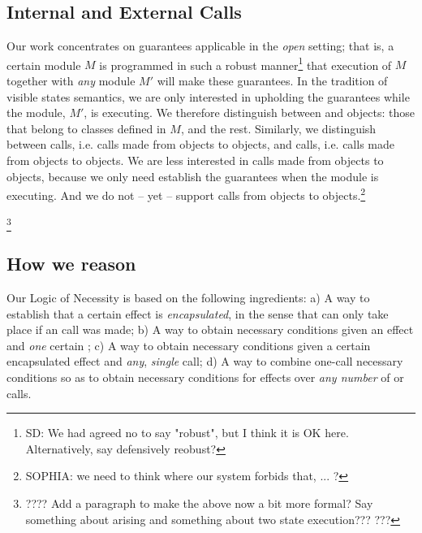 \subsection{Internal and External Calls} 
Our work concentrates on guarantees applicable in the \emph{open} setting; that is, a certain module
$M$ is programmed in such a robust manner\footnote{SD: We had agreed no to say "robust", but I think it is OK here. Alternatively, say defensively reobust?} that execution of $M$ together with \emph{any} \externalM 
module $M'$ will make these guarantees. In the tradition of
visible states semantics, we are  only interested in upholding the guarantees while the 
\externalM module, $M'$, is executing.   
 We therefore distinguish between \emph{\internalO} and
\emph{\externalO} objects: those that belong to classes defined in $M$, and the rest. Similarly, we 
distinguish between \emph{\internalC} calls, i.e. calls made from \externalO objects to \internalO objects,
and \emph{\externalC} calls, i.e. calls made from \externalC objects to \externalC objects. We are less
interested in calls made from \internalO objects to \internalO objects, because we only need 
establish the guarantees when the \externalM module is executing. And we do not -- yet -- support calls from
\internalO objects to \externalO objects.\footnote{SOPHIA: we need to think where our system forbids that, ... ?}

\footnote{???? Add a paragraph to make the above now a bit more formal? Say something about arising and something about two state execution??? ???}

\subsection{How we reason}

Our Logic of Necessity is based on the following ingredients: 
a) A  %
way to  establish that a certain effect is \emph{encapsulated}, in the 
sense that can only take place if an \internalC call was made; 
b) A way to obtain necessary conditions given an effect and \emph{one}
 certain \internalC;
c) A way to obtain necessary conditions given a certain encapsulated effect and \emph{any},
\emph{single} \internalC call;
d) A way to combine one-call   necessary conditions  so as to obtain necessary conditions 
for effects over 
\emph{any number} of \internalC or \externalC calls.

